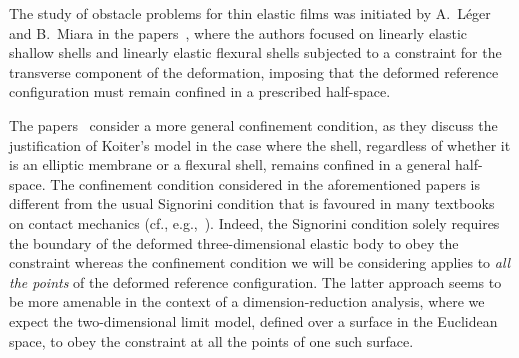 \documentclass{amsart}
\begin{document}
The study of obstacle problems for thin elastic films was initiated by A.~L\'{e}ger and B.~Miara in the papers~\cite{LegMia2008,LegMia2018}, where the authors focused on linearly elastic shallow shells and linearly elastic flexural shells subjected to a constraint for the transverse component of the deformation, imposing that the deformed reference configuration must remain confined in a prescribed half-space.

The papers~\cite{CiaPie2018b,CiaPie2018bCR,CiaMarPie2018b,CiaMarPie2018,PieJDE2022,Pie2023} consider a more general confinement condition, as they discuss the justification of Koiter's model in the case where the shell, regardless of whether it is an elliptic membrane or a flexural shell, remains confined in a general half-space. The confinement condition considered in the aforementioned papers is different from the usual Signorini condition that is favoured in many textbooks on contact mechanics (cf., e.g.,~\cite{KikuchiOden1988}). Indeed, the Signorini condition solely requires the boundary of the deformed three-dimensional elastic body to obey the constraint whereas the confinement condition we will be considering applies to \emph{all the points} of the deformed reference configuration. The latter approach seems to be more amenable in the context of a dimension-reduction analysis, where we expect the two-dimensional limit model, defined over a surface in the Euclidean space, to obey the constraint at all the points of one such surface.
\end{document}
